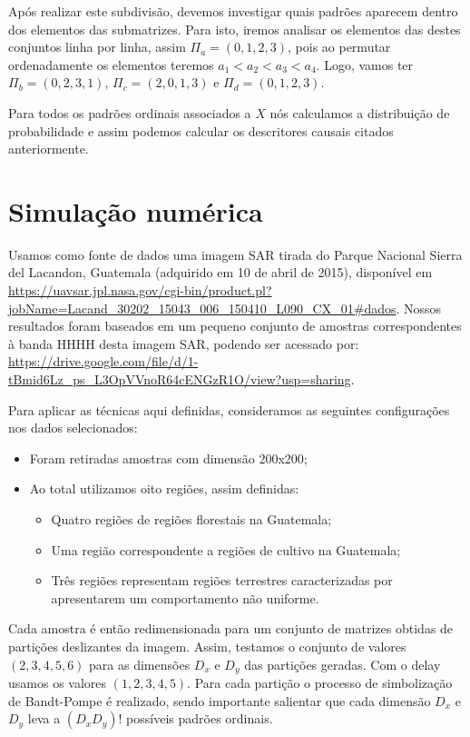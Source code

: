 \documentclass[12pt]{article}
\begin{document}
Após realizar este subdivisão, devemos investigar quais padrões aparecem dentro dos elementos das submatrizes. Para isto, iremos analisar os elementos das destes conjuntos linha por linha, assim $\Pi_{a} = (0,1,2,3)$, pois ao permutar ordenadamente os elementos teremos $a_{1} < a_{2} < a_{3} < a_{4}$. Logo, vamos ter $\Pi_{b} = (0,2,3,1)$, $\Pi_{c} = (2,0,1,3)$ e $\Pi_{d} = (0,1,2,3)$. 

Para todos os padrões ordinais associados a $X$ nós calculamos a distribuição de probabilidade e assim podemos calcular os descritores causais citados anteriormente.

\section{Simulação numérica}

Usamos como fonte de dados uma imagem SAR tirada do Parque Nacional Sierra del Lacandon, Guatemala (adquirido em 10 de abril de 2015), disponível em \url{https://uavsar.jpl.nasa.gov/cgi-bin/product.pl?jobName=Lacand_30202_15043_006_150410_L090_CX_01#dados}. Nossos resultados foram baseados em um pequeno conjunto de amostras correspondentes à banda HHHH desta imagem SAR, podendo ser acessado por: \url{https://drive.google.com/file/d/1-tBmid6Lz_ps_L3OpVVnoR64cENGzR1O/view?usp=sharing}.

Para aplicar as técnicas aqui definidas, consideramos as seguintes configurações nos dados selecionados:

\begin{itemize}
    \item Foram retiradas amostras com dimensão 200x200;
    \item Ao total utilizamos oito regiões, assim definidas:
    \begin{itemize}
        \item Quatro regiões de regiões florestais na Guatemala;
        \item Uma região correspondente a regiões de cultivo na Guatemala;
        \item Três regiões representam regiões terrestres caracterizadas por apresentarem um comportamento não uniforme.
    \end{itemize}
\end{itemize}

Cada amostra é então redimensionada para um conjunto de matrizes obtidas de partições deslizantes da imagem. Assim, testamos o conjunto de valores $(2,3,4,5,6)$ para as dimensões $D_{x}$ e $D_{y}$ das partições geradas. Com o delay usamos os valores $(1,2,3,4,5)$. Para cada partição o processo de simbolização de Bandt-Pompe é realizado, sendo importante salientar que cada dimensão $D_{x}$ e $D_{y}$ leva a $(D_{x}D_{y})!$ possíveis padrões ordinais. 
\end{document}
